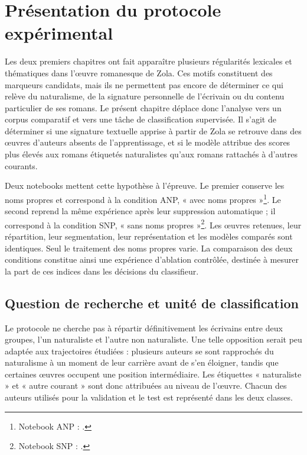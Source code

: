 \section{Présentation du protocole expérimental}
\label{sec:protocole_classification}

Les deux premiers chapitres ont fait apparaître plusieurs régularités lexicales et thématiques dans l'œuvre romanesque de Zola. Ces motifs constituent des marqueurs candidats, mais ils ne permettent pas encore de déterminer ce qui relève du naturalisme, de la signature personnelle de l'écrivain ou du contenu particulier de ses romans. Le présent chapitre déplace donc l'analyse vers un corpus comparatif et vers une tâche de classification supervisée. Il s'agit de déterminer si une signature textuelle apprise à partir de Zola se retrouve dans des œuvres d'auteurs absents de l'apprentissage, et si le modèle attribue des scores plus élevés aux romans étiquetés naturalistes qu'aux romans rattachés à d'autres courants.

Deux notebooks mettent cette hypothèse à l'épreuve. Le premier conserve les noms propres et correspond à la condition ANP, « avec noms propres »\footnote{Notebook ANP : .}. Le second reprend la même expérience après leur suppression automatique ; il correspond à la condition SNP, « sans noms propres »\footnote{Notebook SNP : .}. Les œuvres retenues, leur répartition, leur segmentation, leur représentation et les modèles comparés sont identiques. Seul le traitement des noms propres varie. La comparaison des deux conditions constitue ainsi une expérience d'ablation contrôlée, destinée à mesurer la part de ces indices dans les décisions du classifieur.

\subsection{Question de recherche et unité de classification}

Le protocole ne cherche pas à répartir définitivement les écrivains entre deux groupes, l'un naturaliste et l'autre non naturaliste. Une telle opposition serait peu adaptée aux trajectoires étudiées : plusieurs auteurs se sont rapprochés du naturalisme à un moment de leur carrière avant de s'en éloigner, tandis que certaines œuvres occupent une position intermédiaire. Les étiquettes « naturaliste » et « autre courant » sont donc attribuées au niveau de l'œuvre. Chacun des auteurs utilisés pour la validation et le test est représenté dans les deux classes.

